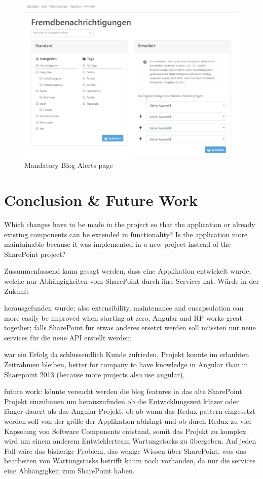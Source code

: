 \documentclass[Bachelor,BIF,english]{twbook}
\begin{document}
\begin{figure}[!htbp]
\centering
\includegraphics[width=1\linewidth]{PICs/mandatory_alerts.eps}
\caption{Mandatory Blog Alerts page}\label{FigMandatoryAlerts}
\end{figure}
\clearpage


\chapter{Conclusion \& Future Work}
Which changes have to be made in the project so that the application or already existing components can be extended in functionality?
Is the application more maintainable because it was implemented in a new project instead of the SharePoint project?

Zusammenfassend kann gesagt werden, dass eine Applikation entwickelt wurde, welche nur Abhängigkeiten vom SharePoint durch ihre Services hat. Würde in der Zukunft

herausgefunden wurde:
also extensibility, maintenance and encapsulation can more easily be improved when starting at zero,
Angular and RP works great together;
falls SharePoint für etwas anderes ersetzt werden soll müssten nur neue services für die neue API erstellt werden;

war ein Erfolg da schlussendlich Kunde zufrieden, Projekt konnte im erlaubten Zeitrahmen bleiben,
better for company to have knowledge in Angular than in Sharepoint 2013 (because more projects also use angular),

future work:
könnte versucht werden die blog features in das alte SharePoint Projekt einzubauen um herauszufinden ob die Entwicklungszeit kürzer oder länger dauert als das Angular Projekt,
ob ab wann das Redux pattern eingesetzt werden soll von der größe der Applikation abhängt und ob durch Redux zu viel Kapselung von Software Components entstand, somit das Projekt zu komplex wird um einem anderem Entwicklerteam Wartungstasks zu übergeben. Auf jeden Fall wäre das bisherige Problem, das wenige Wissen über SharePoint, was das bearbeiten von Wartungstasks betrifft kaum noch vorhanden, da nur die services eine Abhängigkeit zum SharePoint haben.
\end{document}
